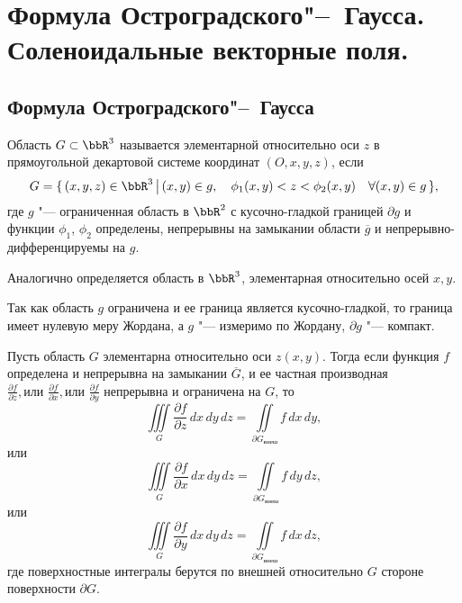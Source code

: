 \chapter[Формула Остроградского"--~Гаусса. Соленоидальные векторные поля.\protect\newline]{Формула Остроградского"--~Гаусса. Соленоидальные векторные поля.}

\section{Формула Остроградского"--~Гаусса}

\begin{defn}
Область $G \subset \bbR^3$ называется элементарной относительно оси $z$ в прямоугольной декартовой системе координат $(O, x, y, z)$, если 
\begin{equation} \label{ch15eq1}
G = \{\, (x,y,z) \in \bbR^3\,\big|\, (x,y) \in g, \quad \phi_1(x,y) < z < \phi_2(x,y) \quad \forall (x,y) \in g\,\}, 
\end{equation}
где $g$ "--- ограниченная область в $\bbR^2$ с кусочно-гладкой границей $\partial g$ и функции $\phi_1$, $\phi_2$ определены, непрерывны на замыкании области $\overline{g}$ и непрерывно-дифференцируемы на $g$.
\end{defn}

Аналогично определяется область в $\bbR^3$, элементарная относительно осей $x,y$.

\begin{notion}
Так как область $g$ ограничена и ее граница является кусочно-гладкой, то граница имеет нулевую меру Жордана, а $g$ "--- измеримо по Жордану, $\partial g$ "--- компакт.
\end{notion}

\begin{lemm} \label{ch15lemm1}
Пусть область $G$ элементарна относительно оси $z(x,y)$. Тогда если функция $f$ определена и непрерывна на замыкании $\overline{G}$, и ее частная производная $\frac{\partial f}{\partial z}, \textit{или }\frac{\partial f}{\partial x}, \textit{или }\frac{\partial f}{\partial y}$ непрерывна и ограничена на $G$, то 
\begin{equation} \label{ch15eq2z}
\iiint\limits_{G} \frac{\partial f}{\partial z}\,dx\,dy\,dz = \iint\limits_{\partial	G_{\textit{внеш}}} f \,dx\,dy,
\end{equation}
или
\begin{equation} \label{ch15eq2x}
\iiint\limits_{G} \frac{\partial f}{\partial x}\,dx\,dy\,dz = \iint\limits_{\partial	G_{\textit{внеш}}} f \,dy\,dz,
\end{equation}
или
\begin{equation} \label{ch15eq2y}
\iiint\limits_{G} \frac{\partial f}{\partial y}\,dx\,dy\,dz = \iint\limits_{\partial	G_{\textit{внеш}}} f \,dx\,dz,
\end{equation}
где поверхностные интегралы берутся по внешней относительно $G$ стороне поверхности $\partial G$.
\end{lemm}

